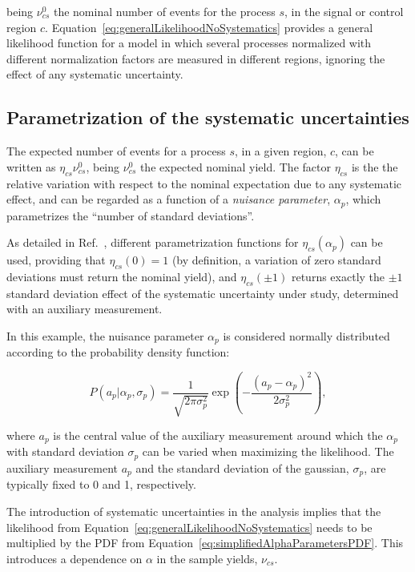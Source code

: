 \noindent being $\nu_{cs}^0$ the nominal number of events for the process $s$, in the signal or control region $c$.
Equation~\ref{eq:generalLikelihoodNoSystematics} provides a general likelihood function for a model in which several processes normalized with different normalization factors are measured in different regions, ignoring the effect of any systematic uncertainty.


\subsection{Parametrization of the systematic uncertainties}
    \label{subsec:StatisticsSystematicSimplified}

The expected number of events for a process $s$, in a given region, $c$, can be written as $\eta_{cs} \nu_{cs}^0$, being $\nu_{cs}^0$ the expected nominal yield.
The factor $\eta_{cs}$ is the the relative variation with respect to the nominal expectation due to any systematic effect, and can be regarded as a function of a \emph{nuisance parameter}, $\alpha_p$, which parametrizes the ``number of standard deviations''.

As detailed in Ref.~\cite{Cranmer:2012sba}, different parametrization functions for $\eta_{cs}(\alpha_p)$ can be used, providing that $\eta_{cs}(0)=1$ (by definition, a variation of zero standard deviations must return the nominal yield), and $\eta_{cs}(\pm 1)$ returns exactly the $\pm 1$ standard deviation effect of the systematic uncertainty under study, determined with an auxiliary measurement.

In this example, the nuisance parameter $\alpha_p$ is considered normally distributed according to the probability density function:

\begin{equation}
P(a_p | \alpha_p, \sigma_p) = \frac{1}{\sqrt{2\pi\sigma_p^2}} \exp{\left(-\frac{(a_p - \alpha_p)^2}{2\sigma_p^2}\right)},
\label{eq:simplifiedAlphaParametersPDF}
\end{equation}

\noindent  where $a_p$ is the central value of the auxiliary measurement around which the $\alpha_p$ with standard deviation $\sigma_p$ can be varied when maximizing the likelihood.
The auxiliary measurement $a_p$ and the standard deviation of the gaussian, $\sigma_p$, are typically fixed to 0 and 1, respectively.

The introduction of systematic uncertainties in the analysis implies that the likelihood from Equation~\ref{eq:generalLikelihoodNoSystematics} needs to be multiplied by the PDF from Equation~\ref{eq:simplifiedAlphaParametersPDF}.
This introduces a dependence on $\alpha$ in the sample yields, $\nu_{cs}$.


